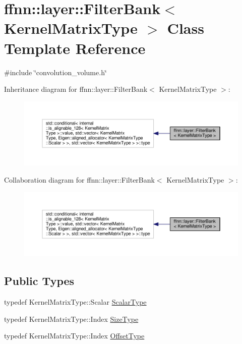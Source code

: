 \hypertarget{classffnn_1_1layer_1_1_filter_bank}{\section{ffnn\-:\-:layer\-:\-:Filter\-Bank$<$ Kernel\-Matrix\-Type $>$ Class Template Reference}
\label{classffnn_1_1layer_1_1_filter_bank}
}


{\ttfamily \#include \char`\"{}convolution\-\_\-volume.\-h\char`\"{}}



Inheritance diagram for ffnn\-:\-:layer\-:\-:Filter\-Bank$<$ Kernel\-Matrix\-Type $>$\-:
\nopagebreak
\begin{figure}[H]
\begin{center}
\leavevmode
\includegraphics[width=350pt]{classffnn_1_1layer_1_1_filter_bank__inherit__graph}
\end{center}
\end{figure}


Collaboration diagram for ffnn\-:\-:layer\-:\-:Filter\-Bank$<$ Kernel\-Matrix\-Type $>$\-:
\nopagebreak
\begin{figure}[H]
\begin{center}
\leavevmode
\includegraphics[width=350pt]{classffnn_1_1layer_1_1_filter_bank__coll__graph}
\end{center}
\end{figure}
\subsection*{Public Types}
\begin{DoxyCompactItemize}
\item 
typedef Kernel\-Matrix\-Type\-::\-Scalar \hyperlink{classffnn_1_1layer_1_1_filter_bank_a9520eb8417c9c124f33c1136d40842d4}{Scalar\-Type}
\item 
typedef Kernel\-Matrix\-Type\-::\-Index \hyperlink{classffnn_1_1layer_1_1_filter_bank_afd78272ebca97ce2f34596ffb9dc6cd9}{Size\-Type}
\item 
typedef Kernel\-Matrix\-Type\-::\-Index \hyperlink{classffnn_1_1layer_1_1_filter_bank_a87d15738c0864b171f2b605af7330432}{Offset\-Type}
\end{DoxyCompactItemize}
